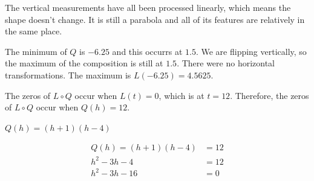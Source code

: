\documentclass{ximera}
\begin{document}
\begin{image}
\end{image}

The vertical measurements have all been processed linearly, which means the shape doesn't change.  It is still a parabola and all of its features are relatively in the same place.



The minimum of $Q$ is $-6.25$ and this occurrs at $1.5$. We are flipping vertically, so the maximum of the composition is still at $1.5$. There were no horizontal transformations.  The maximum is $L(-6.25) = 4.5625$.




The zeros of $L \circ Q$ occur when $L(t) = 0$, which is at $t = 12$.  Therefore, the zeros of $L \circ Q$ occur when $Q(h) = 12$.





$Q(h) = (h+1)(h-4)$



\begin{align*}
Q(h) = (h+1)(h-4)     &  = 12  \\
h^2 - 3h - 4      & = 12   \\
h^2 - 3h - 16 & = 0  
\end{align*}
\end{document}
